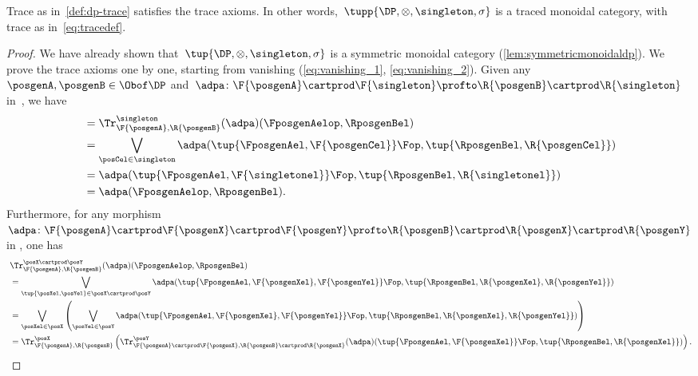 \begin{lemma}
	Trace as in~\cref{def:dp-trace} satisfies the trace axioms.
	In other words,~$\tupp{\DP, \otimes, \singleton, \sigma}$ is a traced monoidal category, with trace as in~\cref{eq:tracedef}.
\end{lemma}
\begin{proof}
	We have already shown that~$\tup{\DP,\otimes,\singleton,\sigma}$ is a symmetric monoidal category (\cref{lem:symmetricmonoidaldp}).
	We prove the trace axioms one by one, starting from vanishing (\cref{eq:vanishing_1}, \cref{eq:vanishing_2}).
	Given any~$\posgenA,\posgenB\in \Obof\DP$ and~$\adpa\colon \F{\posgenA}\cartprod \F{\singleton}\profto \R{\posgenB}\cartprod \R{\singleton}$ in~\DP, we have
	\begin{equation}
		\begin{aligned}
			 & = \Tr_{\F{\posgenA},\R{\posgenB}}^{\singleton}(\adpa)(\FposgenAelop,\RposgenBel)                             \\
			 & =\bigvee_{\posCel\in \singleton}\adpa(\tup{\FposgenAel,\F{\posgenCel}}\Fop,\tup{\RposgenBel,\R{\posgenCel}}) \\
			 & =\adpa(\tup{\FposgenAel,\F{\singletonel}}\Fop,\tup{\RposgenBel,\R{\singletonel}})                            \\
			 & =\adpa(\FposgenAelop,\RposgenBel).
		\end{aligned}
	\end{equation}
	Furthermore, for any morphism~$\adpa\colon \F{\posgenA}\cartprod \F{\posgenX}\cartprod \F{\posgenY} \profto \R{\posgenB}\cartprod \R{\posgenX} \cartprod \R{\posgenY}$ in \DP, one has
	\begin{equation}
		\begin{aligned}
			~ & \Tr_{\F{\posgenA},\R{\posgenB}}^{\posX\cartprod \posY}(\adpa)(\FposgenAelop,\RposgenBel)                                                                                        \\
			  & = \bigvee_{\tup{\posXel,\posYel} \in \posX\cartprod \posY} \adpa(\tup{\FposgenAel,\F{\posgenXel},\F{\posgenYel}}\Fop,\tup{\RposgenBel,\R{\posgenXel},\R{\posgenYel}})           \\
			  & =\bigvee_{\posXel \in \posX}\left(\bigvee_{\posYel \in \posY} \adpa(\tup{\FposgenAel,\F{\posgenXel},\F{\posgenYel}}\Fop,\tup{\RposgenBel,\R{\posgenXel},\R{\posgenYel}})\right) \\
			  & =\Tr_{\F{\posgenA},\R{\posgenB}}^\posX\left(
			\Tr_{\F{\posgenA}\cartprod \F{\posgenX},\R{\posgenB}\cartprod \R{\posgenX}}^\posY(\adpa)(\tup{\FposgenAel,\F{\posgenXel}}\Fop,\tup{\RposgenBel,\R{\posgenXel}})\right).

\end{aligned}
\end{equation}
\end{proof}
